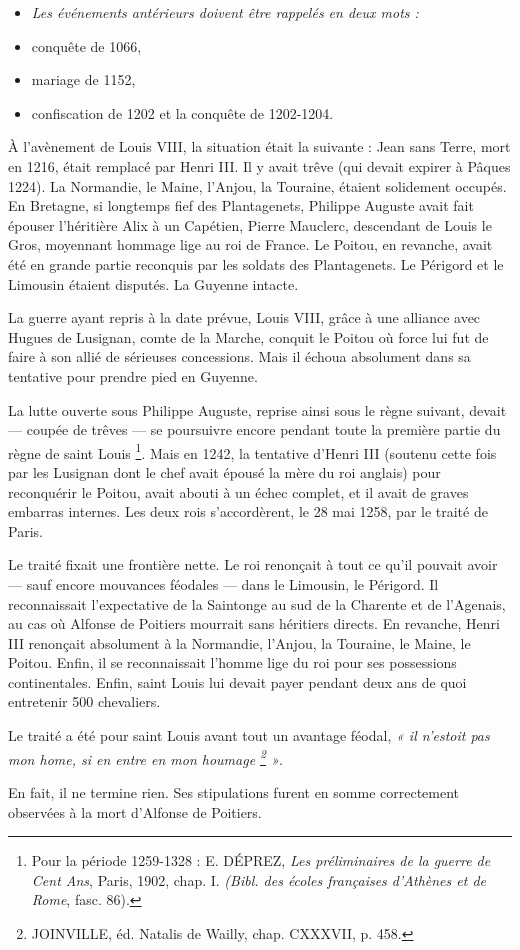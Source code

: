\documentclass[french,twoside]{book} %
\newlength{\listmod}
\newcommand{\listhead}[1]{\hspace{-1\listmod}\emph{#1}}
\begin{document}
\begin{itemize}[itemsep=0pt,]
\item[]\listhead{Les événements antérieurs doivent être rappelés en deux mots :}
\item conquête de 1066,
\item mariage de 1152,
\item confiscation de 1202 et la conquête de 1202-1204.
\end{itemize}
\noindent À l’avènement de Louis VIII, la situation était la suivante : Jean sans Terre, mort en 1216, était remplacé par Henri III. Il y avait trêve (qui devait expirer à Pâques 1224). La Normandie, le Maine, l’Anjou, la Touraine, étaient solidement occupés. En Bretagne, si longtemps fief des Plantagenets, Philippe Auguste avait fait épouser l’héritière Alix à un Capétien, Pierre Mauclerc, descendant de Louis le Gros, moyennant hommage lige au roi de France. Le Poitou, en revanche, avait été en grande partie reconquis par les soldats des Plantagenets. Le Périgord et le Limousin étaient disputés. La Guyenne intacte.\par
La guerre ayant repris à la date prévue, Louis VIII, grâce à une alliance avec Hugues de Lusignan, comte de la Marche, conquit le Poitou où force lui fut de faire à son allié de sérieuses concessions. Mais il échoua absolument dans sa tentative pour prendre pied en Guyenne.\par
La lutte ouverte sous Philippe Auguste, reprise ainsi sous le règne suivant, devait — coupée de trêves — se poursuivre encore pendant toute la première partie du règne de saint Louis \footnote{ Pour la période 1259-1328 : E. DÉPREZ, {\itshape Les préliminaires de la guerre de Cent Ans}, Paris, 1902, chap. I. {\itshape (Bibl. des écoles françaises d’Athènes et de Rome}, fasc. 86).}. Mais en 1242, la tentative d’Henri III (soutenu cette fois par les Lusignan dont le chef avait épousé la mère du roi anglais) pour reconquérir le Poitou, avait abouti à un échec complet, et il avait de graves embarras internes. Les deux rois s’accordèrent, le 28 mai 1258, par le traité de Paris.\par
Le traité fixait une frontière nette. Le roi renonçait à tout ce qu’il pouvait avoir — sauf encore mouvances féodales — dans le Limousin, le Périgord. Il reconnaissait l’expectative de la Saintonge au sud de la Charente et de l’Agenais, au cas où Alfonse de Poitiers mourrait sans héritiers directs. En revanche, Henri III renonçait absolument à la Normandie, l’Anjou, la Touraine, le Maine, le Poitou. Enfin, il se reconnaissait l’homme lige du roi pour ses possessions continentales. Enfin, saint Louis lui devait payer pendant deux ans de quoi entretenir 500 chevaliers.\par
\label{p23} Le traité a été pour saint Louis avant tout un avantage féodal, \emph{« il n’estoit pas mon home, si en entre en mon houmage \footnote{JOINVILLE, éd. Natalis de Wailly, chap. CXXXVII, p. 458.} »}.\par
En fait, il ne termine rien. Ses stipulations furent en somme correctement observées à la mort d’Alfonse de Poitiers.\par
\end{document}
